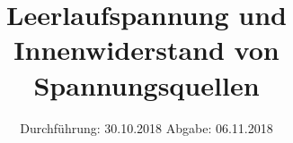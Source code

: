 

\subject{Versuch Nr. 301}
\title{Leerlaufspannung und Innenwiderstand von Spannungsquellen}
\date{%
  Durchführung: 30.10.2018
  \hspace{3em}
  Abgabe: 06.11.2018
}



\maketitle
\thispagestyle{empty}
\tableofcontents
\newpage






\printbibliography{}


